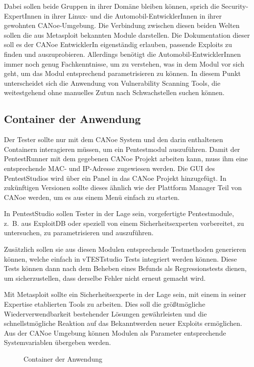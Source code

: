 Dabei sollen beide Gruppen in ihrer Domäne bleiben können, sprich die Security-ExpertInnen in ihrer Linux- und die Automobil-EntwicklerInnen in ihrer gewohnten CANoe-Umgebung. Die Verbindung zwischen diesen beiden Welten sollen die aus Metasploit bekannten Module darstellen. Die Dokumentation dieser soll es der CANoe EntwicklerIn eigenständig erlauben, passende Exploits zu finden und auszuprobieren. Allerdings benötigt die Automobil-EntwicklerInnen immer noch genug Fachkenntnisse, um zu verstehen, was in dem Modul vor sich geht, um das Modul entsprechend parametrisieren zu können. In diesem Punkt unterscheidet sich die Anwendung von Vulnerability Scanning Tools, die weitestgehend ohne manuelles Zutun nach Schwachstellen suchen können. 

\subsection{Container der Anwendung}\label{subsec:container}
Der Tester sollte nur mit dem CANoe System und den darin enthaltenen Containern interagieren müssen, um ein Pentestmodul auszuführen. Damit der PentestRunner mit dem gegebenen CANoe Projekt arbeiten kann, muss ihm eine entsprechende MAC- und IP-Adresse zugewiesen werden. Die GUI des PentestStudios wird über ein Panel in das CANoe Projekt hinzugefügt. In zukünftigen Versionen sollte dieses ähnlich wie der Plattform Manager Teil von CANoe werden, um es aus einem Menü einfach zu starten. 

In PentestStudio sollen Tester in der Lage sein, vorgefertigte Pentestmodule, z. B. aus ExploitDB oder speziell von einem Sicherheitsexperten vorbereitet, zu untersuchen, zu parametrisieren und auszuführen. 

Zusätzlich sollen sie aus diesen Modulen entsprechende Testmethoden generieren können, welche einfach in vTESTstudio Tests integriert werden können. Diese Tests können dann nach dem Beheben eines Befunds als Regressionstests dienen, um sicherzustellen, dass derselbe Fehler nicht erneut gemacht wird. 

Mit Metasploit sollte ein Sicherheitsexperte in der Lage sein, mit einem in seiner Expertise etablierten Tools zu arbeiten. Dies soll die größtmögliche Wiederverwendbarkeit bestehender Lösungen gewährleisten und die schnellstmögliche Reaktion auf das Bekanntwerden neuer Exploits ermöglichen. Aus der CANoe Umgebung können Modulen als Parameter entsprechende Systemvariablen übergeben werden. 

\begin{figure}
	\centering
	
	\caption{Container der Anwendung}
	\label{fig:context}
\end{figure}